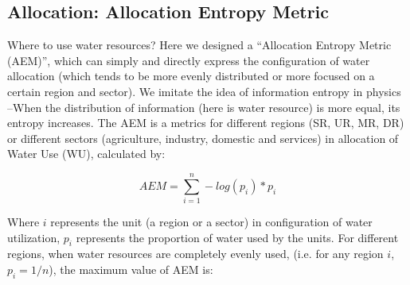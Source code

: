 \documentclass[9pt,twoside,lineno]{pnas-new}
\begin{document}

\subsection*{Allocation: Allocation Entropy Metric}
    Where to use water resources?
    Here we designed a ``Allocation Entropy Metric (AEM)'', which can simply and directly express the configuration of water allocation (which tends to be more evenly distributed or more focused on a certain region and sector).
    We imitate the idea of information entropy in physics --When the distribution of information (here is water resource) is more equal, its entropy increases.
    The AEM is a metrics for different regions (SR, UR, MR, DR) or different sectors (agriculture, industry, domestic and services) in allocation of Water Use (WU), calculated by:

    $$ AEM = \sum_{i=1}^n -log(p_{i}) * p_{i} $$

    Where $i$ represents the unit (a region or a sector) in configuration of water utilization, $p_i$ represents the proportion of water used by the units.
    For different regions, when water resources are completely evenly used, (i.e. for any region $i$, $p_i = 1/n $), the maximum value of AEM is:
\end{document}
